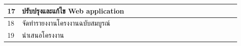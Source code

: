 \documentclass[12pt,oneside,openright,a4paper]{cpe-thai-project}
\begin{document}
\begin{table}[]
{\begin{tabular}{|llllllllllllllllll|}
\multicolumn{1}{|l|}{17}                    & \multicolumn{1}{l|}{ปรับปรุงและแก้ไข Web application}                                     & \multicolumn{1}{l|}{\cellcolor[HTML]{2D8C9F}} & \multicolumn{1}{l|}{\cellcolor[HTML]{2D8C9F}} & \multicolumn{1}{l|}{\cellcolor[HTML]{2D8C9F}} & \multicolumn{1}{l|}{\cellcolor[HTML]{2D8C9F}} & \multicolumn{1}{l|}{\cellcolor[HTML]{2D8C9F}} & \multicolumn{1}{l|}{\cellcolor[HTML]{2D8C9F}} & \multicolumn{1}{l|}{\cellcolor[HTML]{2D8C9F}} & \multicolumn{1}{l|}{\cellcolor[HTML]{2D8C9F}} & \multicolumn{1}{l|}{\cellcolor[HTML]{2D8C9F}} & \multicolumn{1}{l|}{\cellcolor[HTML]{2D8C9F}} & \multicolumn{1}{l|}{\cellcolor[HTML]{2D8C9F}} & \multicolumn{1}{l|}{\cellcolor[HTML]{2D8C9F}} & \multicolumn{1}{l|}{\cellcolor[HTML]{2D8C9F}} & \multicolumn{1}{l|}{\cellcolor[HTML]{2D8C9F}} & \multicolumn{1}{l|}{\cellcolor[HTML]{2D8C9F}} & \cellcolor[HTML]{2D8C9F} \\ \hline
\multicolumn{1}{|l|}{18}                    & \multicolumn{1}{l|}{จัดทำรายงงานโครงงานฉบับสมบูรณ์}                                       & \multicolumn{1}{l|}{}                         & \multicolumn{1}{l|}{}                         & \multicolumn{1}{l|}{}                         & \multicolumn{1}{l|}{}                         & \multicolumn{1}{l|}{}                         & \multicolumn{1}{l|}{}                         & \multicolumn{1}{l|}{}                         & \multicolumn{1}{l|}{}                         & \multicolumn{1}{l|}{\cellcolor[HTML]{2D8C9F}} & \multicolumn{1}{l|}{\cellcolor[HTML]{2D8C9F}} & \multicolumn{1}{l|}{\cellcolor[HTML]{2D8C9F}} & \multicolumn{1}{l|}{\cellcolor[HTML]{2D8C9F}} & \multicolumn{1}{l|}{\cellcolor[HTML]{2D8C9F}} & \multicolumn{1}{l|}{\cellcolor[HTML]{2D8C9F}} & \multicolumn{1}{l|}{\cellcolor[HTML]{2D8C9F}} & \cellcolor[HTML]{2D8C9F} \\ \hline
\multicolumn{1}{|l|}{19}                    & \multicolumn{1}{l|}{นำเสนอโครงงาน}                                                        & \multicolumn{1}{l|}{}                         & \multicolumn{1}{l|}{}                         & \multicolumn{1}{l|}{}                         & \multicolumn{1}{l|}{}                         & \multicolumn{1}{l|}{}                         & \multicolumn{1}{l|}{}                         & \multicolumn{1}{l|}{}                         & \multicolumn{1}{l|}{}                         & \multicolumn{1}{l|}{}                         & \multicolumn{1}{l|}{}                         & \multicolumn{1}{l|}{}                         & \multicolumn{1}{l|}{}                         & \multicolumn{1}{l|}{}                         & \multicolumn{1}{l|}{}                         & \multicolumn{1}{l|}{}                         & \cellcolor[HTML]{2D8C9F} \\ \hline
\end{tabular}%
}
\end{table}
\FloatBarrier
\end{document}
